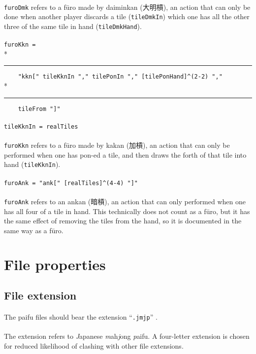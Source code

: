 \documentclass[%
	a4paper%
	,10pt%
	,twoside%
	,notitlepage%
]{article}%
\newcommand*{\ruleSymbol}{\textjapanese{⚠}}%
\newcommand*{\ruleMargin}{\marginpar{\flushright{}\ruleSymbol{}}}%
\newcommand*{\rulePar}{\paragraph*{\ruleMargin{}}}%
\newcommand*{\indentRule}{\rule{10pt}{0pt}}%
\begin{document}
			\paragraph*{}\lstinline/furoDmk/ refers to a f\={u}ro made by daiminkan (\textjapanese{大明槓}), an action that can only be done when another player discards a tile (\lstinline/tileDmkIn/) which one has all the other three of the same tile in hand (\lstinline/tileDmkHand/). %
			\rulePar{}\lstinline/furoKkn = /\\*{}%
			\indentRule{}\lstinline/    "kkn[" tileKknIn "," tilePonIn "," [tilePonHand]^(2-2) "," /\\*{}%
			\indentRule{}\lstinline/    tileFrom "]"/%
			\rulePar{}\lstinline/tileKknIn = realTiles/%
			\paragraph*{}\lstinline/furoKkn/ refers to a f\={u}ro made by kakan (\textjapanese{加槓}), an action that can only be performed when one has pon-ed a tile, and then draws the forth of that tile into hand (\lstinline/tileKknIn/). %
			\rulePar{}\lstinline/furoAnk = "ank[" [realTiles]^(4-4) "]"/%
			\paragraph*{}\lstinline/furoAnk/ refers to an ankan (\textjapanese{暗槓}), an action that can only performed when one has all four of a tile in hand. This technically does not count as a f\={u}ro, but it has the same effect of removing the tiles from the hand, so it is documented in the same way as a f\={u}ro. %
\section{File properties}\label{sec:fileprop}%
% 
	\subsection{File extension}%
		\rulePar{}The paifu files should bear the extension ``\texttt{.jmjp}'' . %
		\paragraph*{}The extension refers to \textit{J\/}apanese \textit{m\/}ah\textit{j\/}ong \textit{p\/}aifu. A four-letter extension is chosen for reduced likelihood of clashing with other file extensions. %
\end{document}
